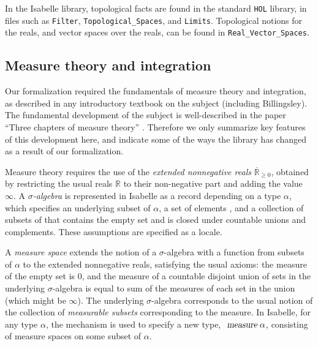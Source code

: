 \documentclass{svjour3}
\newcommand{\RR}{\mathbb{R}}
\newcommand{\ennRR}{\overline{\mathbb{R}}_{\ge 0}}
\begin{document}
In the Isabelle library, topological facts are found in the standard \texttt{HOL} library, in files such as \texttt{Filter}, \texttt{Topological\_Spaces}, and \texttt{Limits}. Topological notions for the reals, and vector spaces over the reals, can be found in \texttt{Real\_Vector\_Spaces}.


\subsection{Measure theory and integration}
\label{subsection:measure:theory}

Our formalization required the fundamentals of measure theory and integration, as described in any introductory textbook on the subject (including Billingsley). The fundamental development of the subject is well-described in the paper ``Three chapters of measure theory'' \cite{hoelzl:heller:11}. Therefore we only summarize key features of this development here, and indicate some of the ways the library has changed as a result of our formalization.

Measure theory requires the use of the \emph{extended nonnegative reals} $\ennRR$, obtained by restricting the usual reals $\RR$ to their non-negative part and adding the value $\infty$. A \emph{$\sigma$-algebra} is represented in Isabelle as a record  depending on a type $\alpha$, which specifies an underlying subset of $\alpha$, a set of elements , and a collection of subsets  of  that contains the empty set and is closed under countable unions and complements. These assumptions are specified as a locale.

A \emph{measure space}  extends the notion of a $\sigma$-algebra with a function  from subsets of $\alpha$ to the extended nonnegative reals, satisfying the usual axioms: the measure of the empty set is $0$, and the measure of a countable disjoint union of sets in the underlying $\sigma$-algebra is equal to sum of the measures of each set in the union (which might be $\infty$). The underlying $\sigma$-algebra corresponds to the usual notion of the collection of \emph{measurable subsets} corresponding to the measure. In Isabelle, for any type $\alpha$, the  mechanism is used to specify a new type, $\isa{measure} \; \alpha$, consisting of measure spaces on some subset of $\alpha$.
\end{document}
